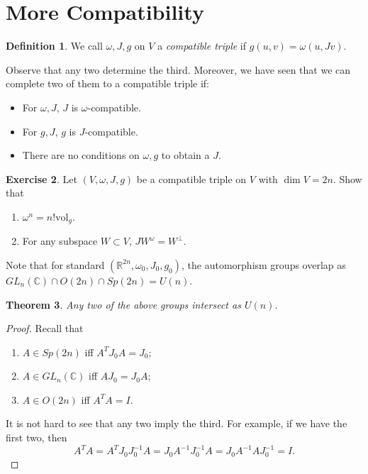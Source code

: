 \documentclass[leqno, openany]{memoir}
\newtheorem{thm}{Theorem}[chapter]
\theoremstyle{definition}
\newtheorem{defn}[thm]{Definition}
\newtheorem{exer}[thm]{Exercise}
\theoremstyle{remark}
\theoremstyle{plain}
\theoremstyle{definition}
\theoremstyle{remark}
\newcommand{\R}{\mathbb{R}}
\newcommand{\C}{\mathbb{C}}
\newcommand{\mr}[1]{\mathrm{#1}}
\begin{document}
\section{More Compatibility}%

\begin{defn} We call $\omega, J, g$ on $V$ a \textit{compatible triple} if
$g(u, v) = \omega(u, Jv)$.  \end{defn}

Observe that any two determine the third. Moreover, we have seen that we can
complete two of them to a compatible triple if: \begin{itemize} \item For
    $\omega, J$, $J$ is $\omega$-compatible.  \item For $g, J$, $g$ is
    $J$-compatible.  \item There are no conditions on $\omega, g$ to obtain a
    $J$.  \end{itemize}

\begin{exer} Let $(V, \omega, J, g)$ be a compatible triple on $V$ with $\dim V
= 2n$. Show that \begin{enumerate}[label=(\alph*)] \item $\omega^n = n!
\mr{vol}_g$.  \item For any subspace $W \subset V$, $J W^{\omega} = W^{\perp}$.
\end{enumerate} \end{exer}

Note that for standard $(\R^{2n}, \omega_0, J_0, g_0)$, the automorphism groups
overlap as $GL_n(\C) \cap O(2n) \cap Sp(2n) = U(n)$.

\begin{thm} Any two of the above groups intersect as $U(n)$.  \end{thm}

\begin{proof} Recall that \begin{enumerate} \item $A \in Sp(2n)$ iff $A^TJ_0A =
J_0$; \item $A \in GL_n(\C)$ iff $AJ_0 = J_0A$; \item $A \in O(2n)$ iff $A^TA =
I$.  \end{enumerate} It is not hard to see that any two imply the third.  For
example, if we have the first two, then \[A^TA = A^TJ_0J_0^{-1}A =
J_0A^{-1}J_0^{-1}A = J_0A^{-1}AJ_0^{-1} = I.\] \end{proof}
\end{document}
